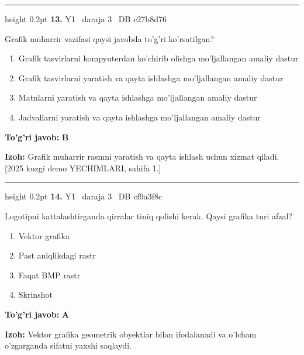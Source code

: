 \documentclass[10pt,a4paper,oneside]{article}
\begin{document}
\vspace{2mm}\hrule height 0.2pt \vspace{4mm}
\hypertarget{q13}{\textbf{\color{ink}13.}}  {\color{muted}\scriptsize Y1 \textbullet\ daraja 3 \textbullet\ DB c27b8d76}
\par
Grafik muharrir vazifasi qaysi javobda to'g'ri ko'rsatilgan?
\begin{enumerate}[label=\Alph*),leftmargin=9mm]
\item Grafik tasvirlarni kompyuterdan ko'chirib olishga mo'ljallangan amaliy dastur
\item Grafik tasvirlarni yaratish va qayta ishlashga mo'ljallangan amaliy dastur
\item Matnlarni yaratish va qayta ishlashga mo'ljallangan amaliy dastur
\item Jadvallarni yaratish va qayta ishlashga mo'ljallangan amaliy dastur
\end{enumerate}
\begin{tcolorbox}[enhanced,breakable,colback=teal!4,colframe=teal!45!black,boxrule=0.45pt,arc=1.2mm,left=2.8mm,right=2.8mm,top=2mm,bottom=2mm,before skip=2mm,after skip=2mm]
\textbf{\color{teal}To'g'ri javob:} \textbf{B}
\par\smallskip
\textbf{Izoh:} Grafik muharrir rasmni yaratish va qayta ishlash uchun xizmat qiladi. [2025 kuzgi demo YECHIMLARI, sahifa 1.]
\end{tcolorbox}
\vspace{2mm}\hrule height 0.2pt \vspace{4mm}
\hypertarget{q14}{\textbf{\color{ink}14.}}  {\color{muted}\scriptsize Y1 \textbullet\ daraja 3 \textbullet\ DB cf9a3f8c}
\par
Logotipni kattalashtirganda qirralar tiniq qolishi kerak. Qaysi grafika turi afzal?
\begin{enumerate}[label=\Alph*),leftmargin=9mm]
\item Vektor grafika
\item Past aniqlikdagi rastr
\item Faqat BMP rastr
\item Skrinshot
\end{enumerate}
\begin{tcolorbox}[enhanced,breakable,colback=teal!4,colframe=teal!45!black,boxrule=0.45pt,arc=1.2mm,left=2.8mm,right=2.8mm,top=2mm,bottom=2mm,before skip=2mm,after skip=2mm]
\textbf{\color{teal}To'g'ri javob:} \textbf{A}
\par\smallskip
\textbf{Izoh:} Vektor grafika geometrik obyektlar bilan ifodalanadi va o'lcham o'zgarganda sifatni yaxshi saqlaydi.
\end{tcolorbox}
\end{document}
